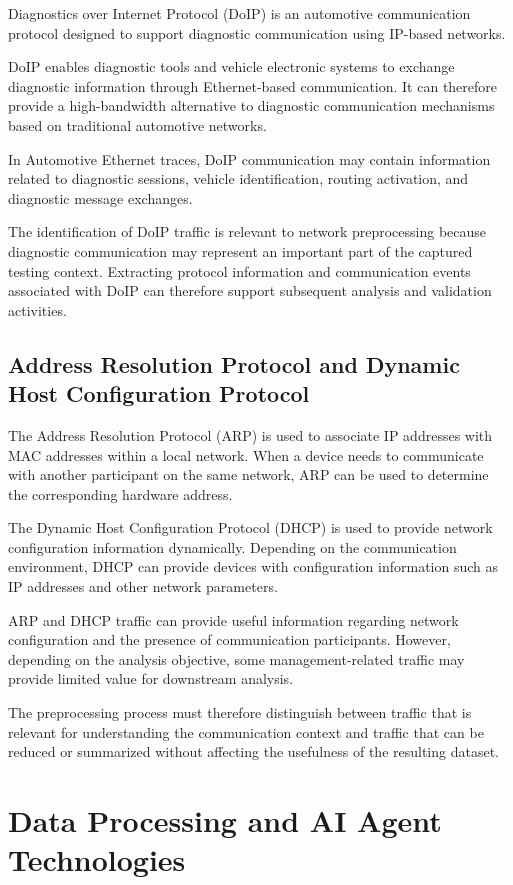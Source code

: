 Diagnostics over Internet Protocol (DoIP) is an automotive communication protocol designed to support diagnostic communication using IP-based networks.

DoIP enables diagnostic tools and vehicle electronic systems to exchange diagnostic information through Ethernet-based communication. It can therefore provide a high-bandwidth alternative to diagnostic communication mechanisms based on traditional automotive networks.

In Automotive Ethernet traces, DoIP communication may contain information related to diagnostic sessions, vehicle identification, routing activation, and diagnostic message exchanges.

The identification of DoIP traffic is relevant to network preprocessing because diagnostic communication may represent an important part of the captured testing context. Extracting protocol information and communication events associated with DoIP can therefore support subsequent analysis and validation activities.

\subsection{Address Resolution Protocol and Dynamic Host Configuration Protocol}

The Address Resolution Protocol (ARP) is used to associate IP addresses with MAC addresses within a local network. When a device needs to communicate with another participant on the same network, ARP can be used to determine the corresponding hardware address.

The Dynamic Host Configuration Protocol (DHCP) is used to provide network configuration information dynamically. Depending on the communication environment, DHCP can provide devices with configuration information such as IP addresses and other network parameters.

ARP and DHCP traffic can provide useful information regarding network configuration and the presence of communication participants. However, depending on the analysis objective, some management-related traffic may provide limited value for downstream analysis.

The preprocessing process must therefore distinguish between traffic that is relevant for understanding the communication context and traffic that can be reduced or summarized without affecting the usefulness of the resulting dataset.

\section{Data Processing and AI Agent Technologies}

